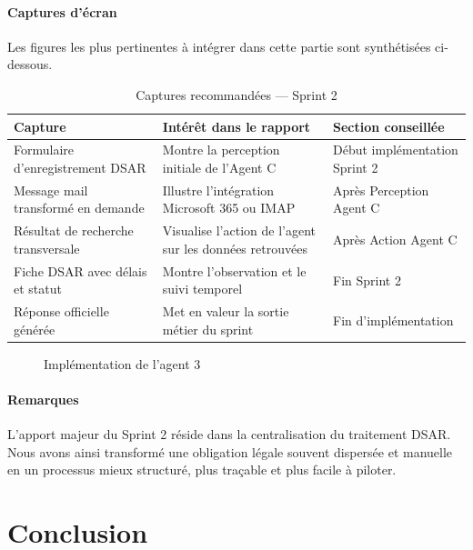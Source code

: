 \documentclass[12pt,a4paper]{report}
\begin{document}
\paragraph{Captures d'écran}

Les figures les plus pertinentes à intégrer dans cette partie sont synthétisées ci-dessous.

\begin{table}[H]
\centering
\caption{Captures recommandées --- Sprint 2}
\label{tab:captures_sprint2}
\begin{tabularx}{\textwidth}{|p{3.4cm}|X|p{3.2cm}|}
\hline
\textbf{Capture} & \textbf{Intérêt dans le rapport} & \textbf{Section conseillée} \\
\hline
Formulaire d'enregistrement DSAR & Montre la perception initiale de l'Agent C & Début implémentation Sprint 2 \\
\hline
Message mail transformé en demande & Illustre l'intégration Microsoft 365 ou IMAP & Après Perception Agent C \\
\hline
Résultat de recherche transversale & Visualise l'action de l'agent sur les données retrouvées & Après Action Agent C \\
\hline
Fiche DSAR avec délais et statut & Montre l'observation et le suivi temporel & Fin Sprint 2 \\
\hline
Réponse officielle générée & Met en valeur la sortie métier du sprint & Fin d'implémentation \\
\hline
\end{tabularx}
\end{table}

\begin{figure}[H]
\centering
{}
\caption{Implémentation de l'agent 3}
\label{fig:realisation_sprint2}
\end{figure}

\paragraph{Remarques}

L'apport majeur du Sprint 2 réside dans la centralisation du traitement DSAR. Nous avons ainsi transformé une obligation légale souvent dispersée et manuelle en un processus mieux structuré, plus traçable et plus facile à piloter.

\section{Conclusion}
\end{document}

